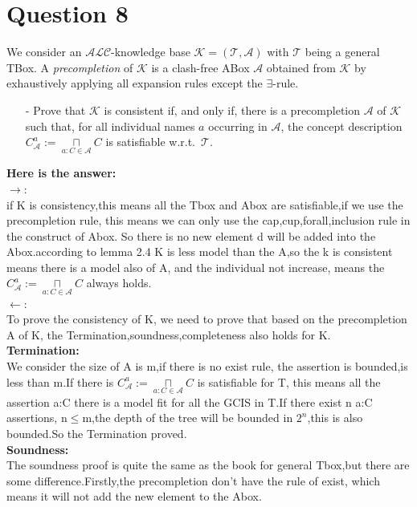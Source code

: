 \documentclass{article}
\begin{document}
    \section{Question 8}
    We consider an $\mathcal{ALC}$-knowledge base $\mathcal{K}=(\mathcal{T},\mathcal{A})$ with $\mathcal{T}$ being a general TBox. A \emph{precompletion} of $\mathcal{K}$ is a clash-free ABox $\mathcal{A}$ obtained from $\mathcal{K}$ by exhaustively applying all expansion rules except the $\exists$-rule.

    \begin{itemize}
        \item[-] Prove that $\mathcal{K}$ is consistent if, and only if, there is a precompletion $\mathcal{A}$ of $\mathcal{K}$ such that, for all individual names $a$ occurring in $\mathcal{A}$, the concept description $C^{a}_{\mathcal{A}} :=\underset{a: C\in\mathcal{A}}{\sqcap}C$ is satisfiable w.r.t.\ $\mathcal{T}$.
    \end{itemize}
    \textbf{Here is the answer:}\\
    $\rightarrow$:\\
    if K is consistency,this means all the Tbox and Abox are satisfiable,if we use the precompletion rule, this means we can only use the cap,cup,forall,inclusion rule in the construct of Abox.
    So there is no new element d will be added into the Abox.according to lemma 2.4 K is less model than the A,so the k is consistent means there is a model also of A, and the individual not increase, means the 
    $C^{a}_{\mathcal{A}} :=\underset{a: C\in\mathcal{A}}{\sqcap}C$ always holds.\\
    $\leftarrow$:\\
    To prove the consistency of K, we need to prove that based on the precompletion A of K, the Termination,soundness,completeness also holds for K.\\
    \textbf{Termination:}\\
    We consider the size of A is m,if there is no exist rule, the assertion is bounded,is less than m.If there is $C^{a}_{\mathcal{A}} :=\underset{a: C\in\mathcal{A}}{\sqcap}C$ is satisfiable for T,
    this means all the assertion a:C there is a model fit for all the GCIS in T.If there exist n a:C assertions, n$\leq$m,the depth of the tree will be bounded in $2^n$,this is also bounded.So the Termination proved.\\
    \textbf{Soundness:}\\
    The soundness proof is quite the same as the book for general Tbox,but there are some difference.Firstly,the precompletion don't have the rule of exist, which means it will not add the new element to the Abox.
\end{document}
